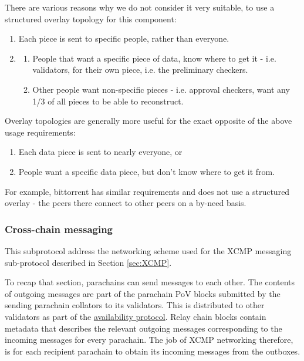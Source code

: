 \documentclass{article}
\begin{document}
There are various reasons why we do not consider it very suitable, to use a
structured overlay topology for this component:

\begin{enumerate}
	\item Each piece is sent to specific people, rather than everyone.
	\item
	\begin{enumerate}
		\item People that want a specific piece of data, know where to get it - i.e.
		validators, for their own piece, i.e. the preliminary checkers.
		\item Other people want non-specific pieces - i.e. approval checkers,
		want any 1/3 of all pieces to be able to reconstruct.
	\end{enumerate}
\end{enumerate}

Overlay topologies are generally more useful for the exact opposite of the
above usage requirements:

\begin{enumerate}
	\item Each data piece is sent to nearly everyone, or
	\item People want a specific data piece, but don't know where to get it from.
\end{enumerate}

For example, bittorrent has similar requirements and does not use a structured
overlay - the peers there connect to other peers on a by-need basis.

\subsubsection{Cross-chain messaging} \label{sec:net_crosschain}

This subprotocol address the networking scheme used for the XCMP messaging sub-protocol described in Section \ref{sec:XCMP}.

To recap that section, parachains can send messages to each other. The contents
of outgoing messages are part of the parachain PoV blocks submitted by the
sending parachain collators to its validators. This is distributed to other
validators as part of the \hyperref[sec:net_storage]{availability protocol}.
Relay chain blocks contain metadata that describes the relevant outgoing
messages corresponding to the incoming messages for every parachain. The job of
XCMP networking therefore, is for each recipient parachain to obtain its
incoming messages from the outboxes.
\end{document}

